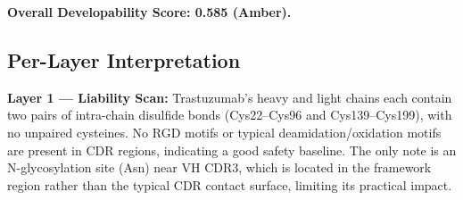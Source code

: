 \documentclass[12pt,a4paper]{article}
\begin{document}
\begin{table}[htbp]
\centering
\caption{Trastuzumab developability assessment results. Scores range 0--1. Traffic-Light: Green ($>$0.6), Amber (0.4--0.6), Red ($<$0.4).}
\label{tab:results}
\end{table}

\textbf{Overall Developability Score: 0.585 (Amber).}

\subsection{Per-Layer Interpretation}

\textbf{Layer 1 --- Liability Scan:} Trastuzumab's heavy and light chains each contain two pairs of intra-chain disulfide bonds (Cys22--Cys96 and Cys139--Cys199), with no unpaired cysteines. No RGD motifs or typical deamidation/oxidation motifs are present in CDR regions, indicating a good safety baseline. The only note is an N-glycosylation site (Asn) near VH CDR3, which is located in the framework region rather than the typical CDR contact surface, limiting its practical impact.
\end{document}
